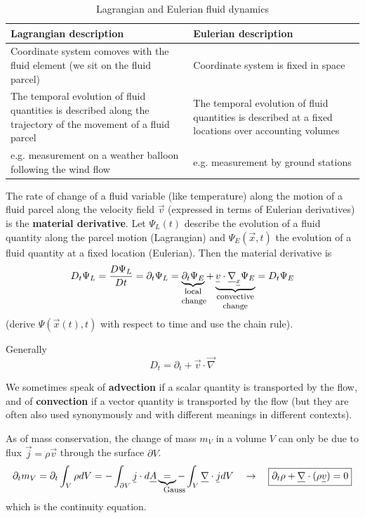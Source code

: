 \begin{table}[!htb]
    \centering
    \begin{tabular}{|p{}|p{}|}
        \hline
        \textcolor{blue1}{Lagrangian description} & \textcolor{blue1}{Eulerian description} \\
        \hline
        Coordinate system comoves with the fluid element (we sit on the fluid parcel) & Coordinate system is fixed in space \\
        \hline
        The temporal evolution of fluid quantities is described along the trajectory of the movement of a fluid parcel & The temporal evolution of fluid quantities is described at a fixed locations over accounting volumes \\
        \hline
        e.g. measurement on a weather balloon following the wind flow & e.g. measurement by ground stations \\
        \hline
    \end{tabular}
    \caption{Lagrangian and Eulerian fluid dynamics}
    \label{tab:lagrangian_eulerian}
\end{table}

The rate of change of a fluid variable (like temperature) along the
motion of a fluid parcel along the velocity field $\vec{v}$ (expressed in terms of Eulerian derivatives) 
is the \textbf{material derivative}. Let $\Psi_L(t)$ describe
the evolution of a fluid quantity along the parcel motion (Lagrangian) and $\Psi_E(\vec{x},t)$ the evolution of a fluid
quantity at a fixed location (Eulerian). Then the material derivative is
\begin{equation}
    D_t \Psi_L = \frac{D\Psi_L}{Dt} = \partial_t \Psi_L =  \explain{\partial_t \Psi_E}{local change} + \explain{\vec{v} \cdot \vec{\nabla}_\vec{x} \Psi_E}{convective change} = D_t \Psi_E
\end{equation}
(derive $\Psi(\vec{x}(t),t)$ with respect to time and use the chain rule).

Generally
\begin{equation}
    D_t = \partial_t + \vec{v} \cdot \vec{\nabla}
\end{equation}

We sometimes speak of \textbf{advection} if a scalar quantity is transported by the flow, and of \textbf{convection} if a vector quantity is transported by the flow
(but they are often also used synonymously and with different meanings in different contexts).

As of mass conservation, the change of mass $m_V$ in a volume $V$ can only be due to flux $\vec{j} = \rho \vec{v}$ through the surface $\partial V$.
\begin{equation}
    \partial_t m_V = \partial_t \int_V \rho dV = - \int_{\partial V} \vec{j} \cdot d\vec{A} \explain{=}{Gauss} - \int_V \vec{\nabla} \cdot \vec{j} dV \quad \rightarrow \quad \boxed{\partial_t \rho + \vec{\nabla} \cdot (\rho \vec{v}) = 0}
\end{equation}
which is the continuity equation.

